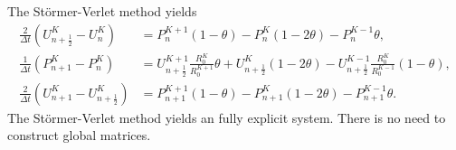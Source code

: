 \documentclass{article}
\begin{document}
The St\"{o}rmer-Verlet method yields
\begin{equation}
	\begin{aligned}
	\frac{2}{\Delta t} \left( U^K_{n+\frac{1}{2}} - U^K_n\right) &= P_n^{K+1} (1-\theta) - P^K_n (1-2\theta) - P^{K-1}_n \theta, \\
	\frac{1}{\Delta t} \left( P^K_{n+1} - P^K_n\right) &= U^{K+1}_{n+\frac{1}{2}} \frac{R_0^K}{R_0^{K+1}} \theta + U_{n+\frac{1}{2}}^K (1-2\theta) - U^{K-1}_{n+\frac{1}{2}} \frac{R_0^K}{R_0^{K-1}}(1-\theta), \\
	\frac{2}{\Delta t} \left( U^K_{n+1} - U^K_{n+\frac{1}{2}}\right) &= P_{n+1}^{K+1} (1-\theta) - P^K_{n+1} (1-2\theta) - P^{K-1}_{n+1} \theta.
	\end{aligned}
\end{equation}
The St\"{o}rmer-Verlet method yields an fully explicit system. There is no need to construct global matrices. 
\end{document}
